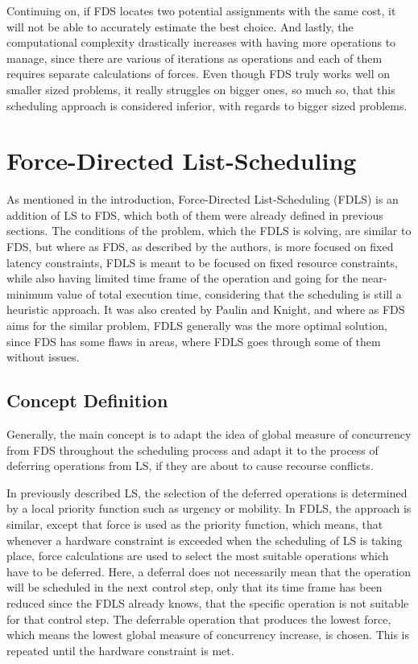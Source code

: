 \documentclass[conference]{IEEEtran}
\begin{document}
Continuing on, if FDS locates two potential assignments with the same cost, it will not be able to accurately estimate the best choice. And lastly, the computational complexity drastically increases with having more operations to manage, since there are various of iterations as operations and each of them requires separate calculations of forces. Even though FDS truly works well on smaller sized problems, it really struggles on bigger ones, so much so, that this scheduling approach is considered inferior, with regards to bigger sized problems.

\section{Force-Directed List-Scheduling}

As mentioned in the introduction, Force-Directed List-Scheduling (FDLS) is an addition of LS to FDS, which both of them were already defined in previous sections. The conditions of the problem, which the FDLS is solving, are similar to FDS, but where as FDS, as described by the authors, is more focused on fixed latency constraints, FDLS is meant to be focused on fixed resource constraints, while also having limited time frame of the operation and going for the near-minimum value of total execution time, considering that the scheduling is still a heuristic approach. It was also created by Paulin and Knight, and where as FDS aims for the similar problem, FDLS generally was the more optimal solution, since FDS has some flaws in areas, where FDLS goes through some of them without issues.

\subsection{Concept Definition}

Generally, the main concept is to adapt the idea of global measure of concurrency from FDS throughout the scheduling process and adapt it to the process of deferring operations from LS, if they are about to cause recourse conflicts. 

In previously described LS, the selection of the deferred operations is determined by a local priority function such as urgency or mobility. In FDLS, the approach is similar, except that force is used as the priority function, which means, that whenever a hardware constraint is exceeded when the scheduling of LS is taking place, force calculations are used to select the most suitable operations which have to be deferred. Here, a deferral does not necessarily mean that the operation will be scheduled in the next control step, only that its time frame has been reduced since the FDLS already knows, that the specific operation is not suitable for that control step. The deferrable operation that produces the lowest force, which means the lowest global measure of concurrency increase, is chosen. This is repeated until the hardware constraint is met.
\end{document}
